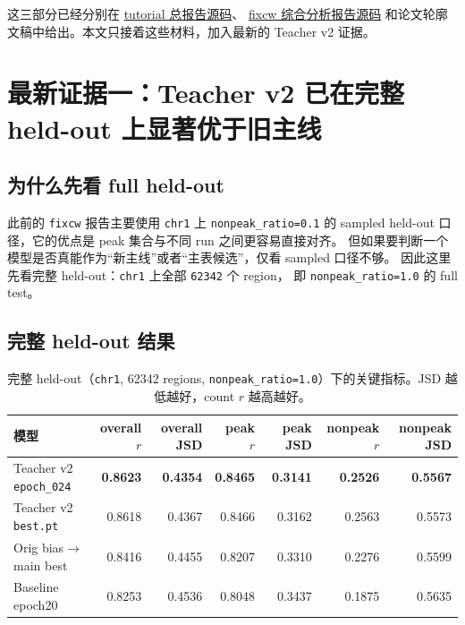 \documentclass[11pt,a4paper]{ctexart}
\begin{document}
这三部分已经分别在
\href{/home/zhengwei/project/python/TransChromBP/reports/transchrombp_tutorial_consolidated_cn.tex}{tutorial 总报告源码}、
\href{/home/zhengwei/project/python/TransChromBP/reports/fixcw_crossmodel_analysis_20260317.tex}{fixcw 综合分析报告源码}
和论文轮廓文稿中给出。本文只接着这些材料，加入最新的 Teacher v2 证据。

\section{最新证据一：Teacher v2 已在完整 held-out 上显著优于旧主线}

\subsection{为什么先看 full held-out}

此前的 \texttt{fixcw} 报告主要使用 \texttt{chr1} 上
\texttt{nonpeak\_ratio=0.1} 的 sampled held-out 口径，它的优点是 peak 集合与不同 run 之间更容易直接对齐。
但如果要判断一个模型是否真能作为“新主线”或者“主表候选”，仅看 sampled 口径不够。
因此这里先看完整 held-out：\texttt{chr1} 上全部 \texttt{62342} 个 region，
即 \texttt{nonpeak\_ratio=1.0} 的 full test。

\subsection{完整 held-out 结果}

\begin{table}[H]
\centering
\small
\caption{完整 held-out（\texttt{chr1}, 62342 regions, \texttt{nonpeak\_ratio=1.0}）下的关键指标。JSD 越低越好，count $r$ 越高越好。}
\begin{tabular}{lrrrrrr}
\toprule
模型 & overall $r$ & overall JSD & peak $r$ & peak JSD & nonpeak $r$ & nonpeak JSD \\
\midrule
Teacher v2 \texttt{epoch\_024} & \textbf{0.8623} & \textbf{0.4354} & \textbf{0.8465} & \textbf{0.3141} & \textbf{0.2526} & \textbf{0.5567} \\
Teacher v2 \texttt{best.pt} & 0.8618 & 0.4367 & 0.8466 & 0.3162 & 0.2563 & 0.5573 \\
Orig bias$\to$main best & 0.8416 & 0.4455 & 0.8207 & 0.3310 & 0.2276 & 0.5599 \\
Baseline epoch20 & 0.8253 & 0.4536 & 0.8048 & 0.3437 & 0.1875 & 0.5635 \\
\bottomrule
\end{tabular}
\end{table}
\end{document}
